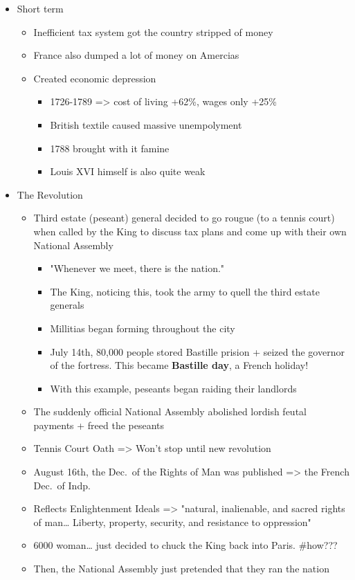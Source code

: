 \documentclass[letterpaper]{article}
\begin{document}
\begin{itemize}
\begin{itemize}
\begin{itemize}
\item Short term

\begin{itemize}
\item Inefficient tax system got the country stripped of money
\item France also dumped a lot of money on Amercias
\item Created economic depression

\begin{itemize}
\item 1726-1789 => cost of living +62\%, wages only +25\%
\item British textile caused massive unempolyment
\item 1788 brought with it famine
\item Louis XVI himself is also quite weak
\end{itemize}
\end{itemize}

\item The Revolution

\begin{itemize}
\item Third estate (peseant) general decided to go rougue (to a tennis
court) when called by the King to discuss tax plans and come up
with their own National Assembly

\begin{itemize}
\item "Whenever we meet, there is the nation."
\item The King, noticing this, took the army to quell the third
estate generals
\item Millitias began forming throughout the city
\item July 14th, 80,000 people stored Bastille prision + seized the
governor of the fortress. This became \textbf{Bastille day}, a French
holiday!
\item With this example, peseants began raiding their landlords
\end{itemize}

\item The suddenly official National Assembly abolished lordish feutal
payments + freed the peseants
\item Tennis Court Oath => Won't stop until new revolution
\item August 16th, the Dec. of the Rights of Man was published => the
French Dec. of Indp.
\item Reflects Enlightenment Ideals => "natural, inalienable, and
sacred rights of man\ldots{} Liberty, property, security, and
resistance to oppression"
\item 6000 woman\ldots{} just decided to chuck the King back into Paris.
\#how???
\item Then, the National Assembly just pretended that they ran the
nation


\end{itemize}
\end{itemize}
\end{itemize}
\end{itemize}
\end{document}
